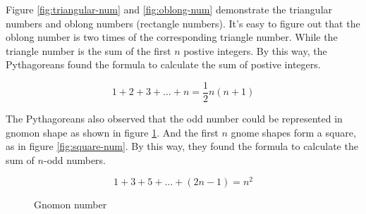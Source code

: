 \documentclass{article}
\begin{document}
Figure \ref{fig:triangular-num} and \ref{fig:oblong-num} demonstrate the triangular numbers and oblong numbers (rectangle numbers). It's easy to figure out that the oblong number is two times of the corresponding triangle number. While the triangle number is the sum of the first $n$ postive integers. By this way, the Pythagoreans found the formula to calculate the sum of postive integers.

\[
1 + 2 + 3 + ... + n = \frac{1}{2}n(n+1)
\]

The Pythagoreans also observed that the odd number could be represented in gnomon shape as shown in figure \ref{fig:gnomon-num}. And the first $n$ gnome shapes form a square, as in figure \ref{fig:square-num}. By this way, they found the formula to calculate the sum of $n$-odd numbers.

\[
1 + 3 + 5 + ... + (2n - 1) = n^2
\]

\begin{figure}[htbp]
\centering
{}
\caption{Gnomon number}
\label{fig:gnomon-num}
\end{figure}
\end{document}
